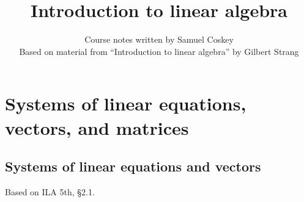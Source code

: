 \documentclass[11pt,oneside]{amsbook}
\title{Introduction to linear algebra}
\author{Course notes written by Samuel Coskey\\Based on material from ``Introduction to linear algebra'' by Gilbert Strang}
\theoremstyle{definition}
\theoremstyle{plain}
\theoremstyle{definition}
\theoremstyle{remark}
\numberwithin{equation}{section}
\numberwithin{figure}{section}
\begin{document}
\maketitle

\tableofcontents

\chapter{Systems of linear equations, vectors, and matrices}


\section{Systems of linear equations and vectors}

Based on ILA 5th, \S 2.1.
\end{document}
